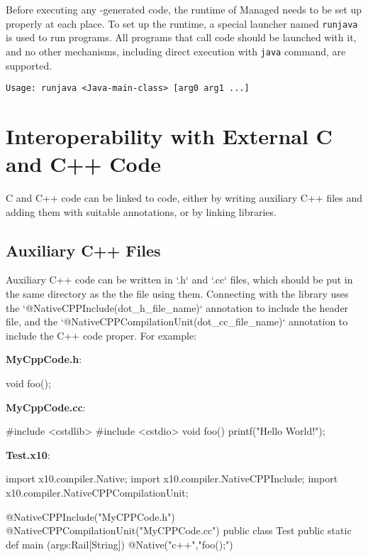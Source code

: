 Before executing any \Xten{}-generated \Java{} code, the runtime of Managed
\Xten{} needs to be set up properly at each place.  To set up the runtime,
a special launcher named \verb|runjava| is used to run \Java{} programs.
All \Java{} programs that call \Xten{} code should be launched with it, and
no other mechanisms, including direct execution with \verb|java| command, are
supported.

\begin{verbatim}
Usage: runjava <Java-main-class> [arg0 arg1 ...]
\end{verbatim}


\section{Interoperability with External C and C++ Code}

C and C++ code can be linked to \Xten{} code, either by writing auxiliary C++ files and
adding them with suitable annotations, or by linking libraries.

\subsection{Auxiliary C++ Files}

Auxiliary C++ code can be written in \xcd`.h` and \xcd`.cc` files, which
should be put in the same directory as the the \Xten{} file using them.
Connecting with the library uses the \xcd`@NativeCPPInclude(dot_h_file_name)`
annotation to include the header file, and the 
\xcd`@NativeCPPCompilationUnit(dot_cc_file_name)` annotation to include the
C++ code proper.  For example: 

{\bf MyCppCode.h}: 
\begin{xten}
void foo();
\end{xten}


{\bf MyCppCode.cc}:
\begin{xten}
#include <cstdlib>
#include <cstdio>
void foo() {
    printf("Hello World!\n");
}
\end{xten}

{\bf Test.x10}:
\begin{xten}
import x10.compiler.Native;
import x10.compiler.NativeCPPInclude;
import x10.compiler.NativeCPPCompilationUnit;

@NativeCPPInclude("MyCPPCode.h")
@NativeCPPCompilationUnit("MyCPPCode.cc")
public class Test {
    public static def main (args:Rail[String]) {
        { @Native("c++","foo();") {} }
    }
}
\end{xten}

